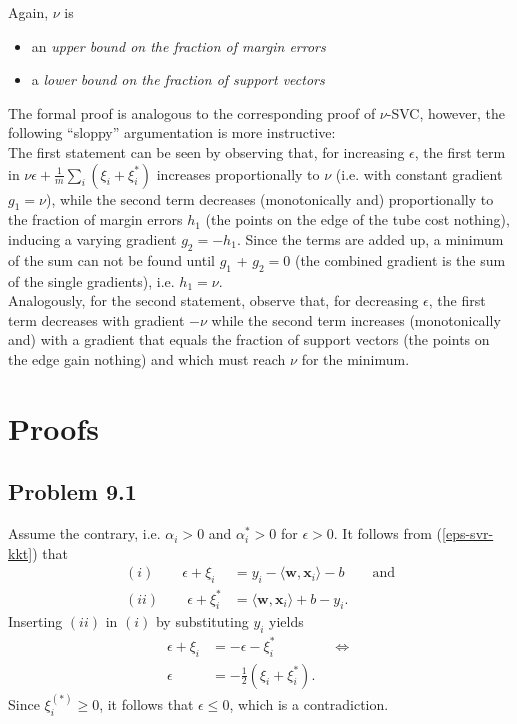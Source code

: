\documentclass[a4paper,10pt]{article}
\makeatletter
\renewenvironment{proof}[1][\proofname]{\par
  \pushQED{\qed}%
  \normalfont \topsep6\p@\@plus6\p@\relax
  \trivlist
  \item[\hskip\labelsep
        \itshape
    #1\@addpunct{:}]\ignorespaces
}{
  \popQED\endtrivlist\@endpefalse
}
\makeatother
\begin{document}
Again, $\nu$ is 
\begin{itemize}
 \item an \textit{upper bound on the fraction of margin errors}
 \item a \textit{lower bound on the fraction of support vectors}
\end{itemize}
The formal proof is analogous to the corresponding proof of $\nu$-SVC, however, the following ``sloppy'' argumentation is more instructive:\\
The first statement can be seen by observing that, for increasing $\epsilon$, the first term in $\nu \epsilon + \frac{1}{m}\sum_i(\xi_i+\xi_i^*)$ increases proportionally to $\nu$ (i.e. with constant gradient $g_1 = \nu$), while the second term decreases (monotonically and) proportionally to the fraction of margin errors $h_1$ (the points on the edge of the tube cost nothing), inducing a varying gradient $g_2=-h_1$. Since the terms are added up, a minimum of the sum can not be found until $g_1$ + $g_2 = 0$ (the combined gradient is the sum of the single gradients), i.e. $h_1=\nu$.\\
Analogously, for the second statement, observe that, for decreasing $\epsilon$, the first term decreases with gradient $-\nu$ while the second term increases (monotonically and) with a gradient that equals the fraction of support vectors (the points on the edge gain nothing) and which must reach $\nu$ for the minimum.

\section{Proofs}
\label{Proofs}
\subsection{Problem 9.1}
\begin{proof}[For $\epsilon>0$ the solution of the $\epsilon$-SVR dual satisfies $\alpha_i \alpha_i^* = 0$]
Assume the contrary, i.e. $\alpha_i>0$ and $\alpha_i^*>0$ for $\epsilon>0$. It follows from (\ref{eps-svr-kkt}) that
\begin{equation*}
\begin{split}
 (i) \qquad \epsilon + \xi_i &= y_i-\langle\mathbf{w},\mathbf{x}_i\rangle-b \qquad \text{and}\\
 (ii) \qquad \epsilon + \xi_i^* &= \langle\mathbf{w},\mathbf{x}_i\rangle+b - y_i.
\end{split}
\end{equation*} 
Inserting $(ii)$ in $(i)$ by substituting $y_i$ yields
\begin{equation*}
 \begin{split}
 \epsilon+\xi_i &= -\epsilon-\xi_i^* \qquad\qquad \Leftrightarrow \\
 \epsilon &= -\frac{1}{2} (\xi_i+\xi_i^*).
 \end{split}
\end{equation*}
Since $\xi_i^{(*)}\ge 0$, it follows that $\epsilon \le 0$, which is a contradiction.
\end{proof}
\end{document}
